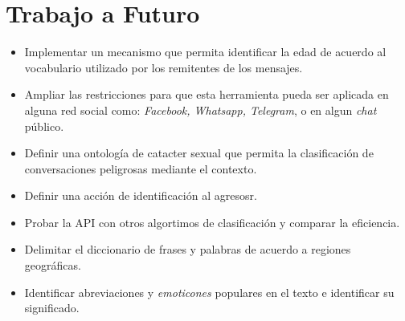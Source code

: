 \section{Trabajo a Futuro}

   \begin{itemize}
\item Implementar un mecanismo que permita identificar la edad de acuerdo al vocabulario utilizado por los remitentes de los mensajes.
\item Ampliar las restricciones para que esta herramienta pueda ser aplicada en alguna red social como: \textit{Facebook, Whatsapp, Telegram}, o en algun \textit{chat} p\'ublico.
\item Definir una ontolog\'ia de catacter sexual que permita la clasificaci\'on de conversaciones peligrosas mediante el contexto.
\item Definir una acci\'on de identificaci\'on al agresosr.
\item Probar la API con otros algortimos de clasificaci\'on y comparar la eficiencia.
\item Delimitar el diccionario de frases y palabras de acuerdo a regiones geogr\'aficas.
\item Identificar abreviaciones y \textit{emoticones} populares en el texto e identificar su significado.





\end{itemize}




